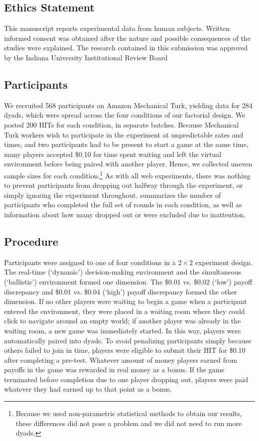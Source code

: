 \documentclass[10pt,letterpaper]{article}
\begin{document}
\subsection*{Ethics Statement}
This manuscript reports experimental data from human subjects. Written informed consent was obtained after the nature and possible consequences of the studies were explained. The research contained in this submission was approved by the Indiana University Institutional Review Board

\subsection*{Participants}
We recruited 568 participants on Amazon Mechanical Turk, yielding data for 284 dyads, which were spread across the four conditions of our factorial design. We posted 200 HITs for each condition, in separate batches. Because Mechanical Turk workers wish to participate in the experiment at unpredictable rates and times, and two participants had to be present to start a game at the same time, many players accepted \$0.10 for time spent waiting and left the virtual environment before being paired with another player. Hence, we collected uneven sample sizes for each condition.\footnote{Because we used non-parametric statistical methods to obtain our results, these differences did not pose a problem and we did not need to run more dyads.} As with all web experiments, there was nothing to prevent participants from dropping out halfway through the experiment, or simply ignoring the experiment throughout.  summarizes the number of participants who completed the full set of rounds in each condition, as well as information about how many dropped out or were excluded due to inattention. 

\subsection*{Procedure}
Participants were assigned to one of four conditions in a $2\times 2$ experiment design. The real-time (`dynamic') decision-making environment and the simultaneous (`ballistic') environment formed one dimension. The \$0.01 vs. \$0.02 (`low') payoff discrepancy and \$0.01 vs. \$0.04 (`high') payoff discrepancy formed the other dimension. If no other players were waiting to begin a game when a participant entered the environment, they were placed in a waiting room where they could click to navigate around an empty world; if another player was already in the waiting room, a new game was immediately started. In this way, players were automatically paired into dyads. To avoid penalizing participants simply because others failed to join in time, players were eligible to submit their HIT for \$0.10 after completing a pre-test. Whatever amount of money players earned from payoffs in the game was rewarded in real money as a bonus. If the game terminated before completion due to one player dropping out, players were paid whatever they had earned up to that point as a bonus.
\end{document}
